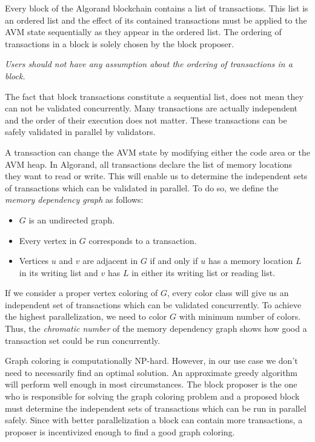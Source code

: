 \documentclass[11pt, A4]{report}
\begin{document}
    Every block of the Algorand blockchain contains a list of transactions. This list is an ordered list and the
    effect of its contained transactions must be applied to the AVM state sequentially as they appear in the ordered
    list. The ordering of transactions in a block is solely chosen by the block proposer.

    \emph{Users should not have any assumption about the ordering of transactions in a block.}

    The fact that block transactions constitute a sequential list, does not mean they can not be validated
    concurrently. Many transactions are actually independent and the order of their execution does not matter. These
    transactions can be safely validated in parallel by validators.

    A transaction can change the AVM state by modifying either the code area or the AVM heap. In Algorand, all
    transactions declare the list of memory locations they want to read or write. This will enable us to determine the
    independent sets of transactions which can be validated in parallel. To do so, we define the \emph{memory dependency
    graph} as follows:

    \begin{itemize}
        \item \(G\) is an undirected graph.
        \item Every vertex in \(G\) corresponds to a transaction.
        \item Vertices \(u\) and \(v\) are adjacent in \(G\) if and only if \(u\) has a memory location \(L\) in its
        writing list and \(v\) has \(L\) in either its writing list or reading list.
    \end{itemize}

    If we consider a proper vertex coloring of \(G\), every color class will give us an independent set of
    transactions which can be validated concurrently. To achieve the highest parallelization, we need to color \(G\)
    with minimum number of colors. Thus, the \emph{chromatic number} of the memory dependency graph shows how good a
    transaction set could be run concurrently.

    Graph coloring is computationally NP-hard. However, in our use case we don't need to necessarily find an optimal
    solution. An approximate greedy algorithm will perform well enough in most circumstances. The block proposer is the
    one who is responsible for solving the graph coloring problem and a proposed block must determine the independent
    sets of transactions which can be run in parallel safely. Since with better parallelization a block can contain more
    transactions, a proposer is incentivized enough to find a good graph coloring.
\end{document}
